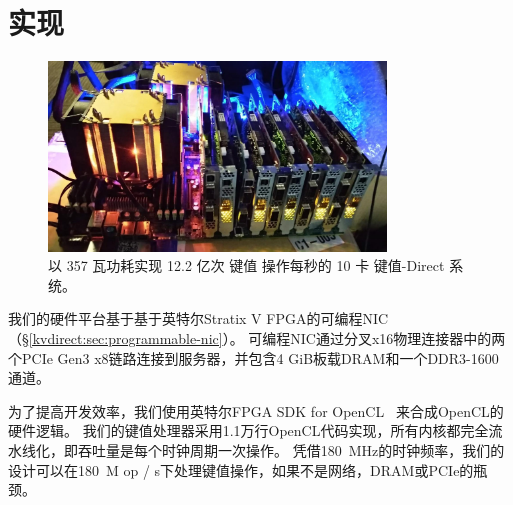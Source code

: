 \section{实现}
\label{kvdirect:sec:implementation}



\begin{figure}[htbp]
	\centering
	\includegraphics[width=0.8\textwidth]{figure/kvdirect_photo.jpg}
	\caption{以 357 瓦功耗实现 12.2 亿次 键值 操作每秒的 10 卡 键值-Direct 系统。}
	\label{kvdirect:fig:photo}
\end{figure}

我们的硬件平台基于基于英特尔Stratix V FPGA的可编程NIC（\S \ref {kvdirect:sec:programmable-nic}）。
可编程NIC通过分叉x16物理连接器中的两个PCIe Gen3 x8链路连接到服务器，并包含4 GiB板载DRAM和一个DDR3-1600通道。

为了提高开发效率，我们使用英特尔FPGA SDK for OpenCL~ \cite {aoc}来合成OpenCL的硬件逻辑。
我们的键值处理器采用1.1万行OpenCL代码实现，所有内核都完全流水线化，即吞吐量是每个时钟周期一次操作。
凭借180~MHz的时钟频率，我们的设计可以在180~M op / s下处理键值操作，如果不是网络，DRAM或PCIe的瓶颈。
%


